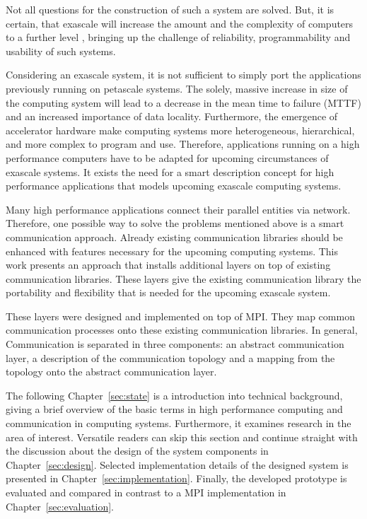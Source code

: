 Not all questions for the construction of such a system are
solved. But, it is certain, that exascale will increase the amount and
the complexity of computers to a further level \cite{ref:cresta},
bringing up the challenge of reliability, programmability and
usability of such systems.

Considering an exascale system, it is not sufficient to simply port
the applications previously running on petascale systems. The solely,
massive increase in size of the computing system will lead to a
decrease in the mean time to failure (MTTF) and an increased
importance of data locality.  Furthermore, the emergence of
accelerator hardware make computing systems more heterogeneous,
hierarchical, and more complex to program and use. Therefore,
applications running on a high performance computers have to be
adapted for upcoming circumstances of exascale systems. It exists the
need for a smart description concept for high performance applications
that models upcoming exascale computing systems.

Many high performance applications connect their parallel entities via
network.  Therefore, one possible way to solve the problems mentioned
above is a smart communication approach. Already existing
communication libraries should be enhanced with features necessary for
the upcoming computing systems.  This work presents an approach that
installs additional layers on top of existing communication
libraries. These layers give the existing communication library the
portability and flexibility that is needed for the upcoming exascale
system.

These layers were designed and implemented on top of MPI. They map
common communication processes onto these existing communication
libraries. In general, Communication is separated in three components:
an abstract communication layer, a description of the communication
topology and a mapping from the topology onto the abstract
communication layer.

The following Chapter~\ref{sec:state} is a introduction
into technical background, giving a brief overview of the basic terms
in high performance computing and communication in computing
systems. Furthermore, it examines research in the area of
interest. Versatile readers can skip this section and continue
straight with the discussion about the design of the system components
in Chapter~\ref{sec:design}.  Selected implementation details of the designed
system is presented in Chapter~\ref{sec:implementation}.  Finally, the
developed prototype is evaluated and compared in contrast to a MPI
implementation in Chapter~\ref{sec:evaluation}.


\cleardoublepage

